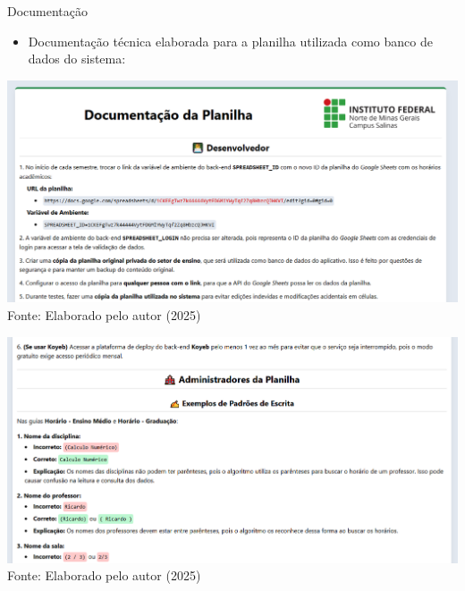 \begin{frame}{Documentação}
    \begin{itemize}
        \item Documentação técnica elaborada para a planilha utilizada como banco de dados do sistema:
    \end{itemize}
    \begin{minipage}{0.48\textwidth}
        \centering
        \includegraphics[width=1\textwidth]{figuras/doc-1.png}
        \footnotesize Fonte: Elaborado pelo autor (2025)
    \end{minipage}
    \hfill
    \begin{minipage}{0.48\textwidth}
        \centering
        \includegraphics[width=1\textwidth]{figuras/doc-2.png}
        \footnotesize Fonte: Elaborado pelo autor (2025)
    \end{minipage}
\end{frame}

